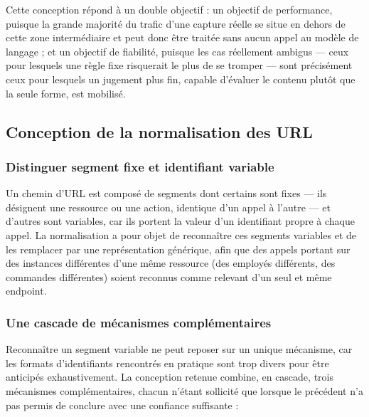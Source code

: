 Cette conception répond à un double objectif : un objectif de performance, puisque la grande majorité du trafic d'une capture réelle se situe en dehors de cette zone intermédiaire et peut donc être traitée sans aucun appel au modèle de langage ; et un objectif de fiabilité, puisque les cas réellement ambigus — ceux pour lesquels une règle fixe risquerait le plus de se tromper — sont précisément ceux pour lesquels un jugement plus fin, capable d'évaluer le contenu plutôt que la seule forme, est mobilisé.

\subsection{Conception de la normalisation des URL}

\subsubsection{Distinguer segment fixe et identifiant variable}

Un chemin d'URL est composé de segments dont certains sont fixes — ils désignent une ressource ou une action, identique d'un appel à l'autre — et d'autres sont variables, car ils portent la valeur d'un identifiant propre à chaque appel. La normalisation a pour objet de reconnaître ces segments variables et de les remplacer par une représentation générique, afin que des appels portant sur des instances différentes d'une même ressource (des employés différents, des commandes différentes) soient reconnus comme relevant d'un seul et même endpoint.

\subsubsection{Une cascade de mécanismes complémentaires}

Reconnaître un segment variable ne peut reposer sur un unique mécanisme, car les formats d'identifiants rencontrés en pratique sont trop divers pour être anticipés exhaustivement. La conception retenue combine, en cascade, trois mécanismes complémentaires, chacun n'étant sollicité que lorsque le précédent n'a pas permis de conclure avec une confiance suffisante :

